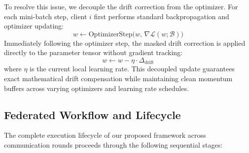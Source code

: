 To resolve this issue, we decouple the drift correction from the optimizer. For each mini-batch step, client $i$ first performs standard backpropagation and optimizer updating:
\begin{equation}
    w \leftarrow \text{OptimizerStep}\big(w, \, \nabla \mathcal{L}(w; \mathcal{B})\big)
    \label{eq:optimizer_step}
\end{equation}
Immediately following the optimizer step, the masked drift correction is applied directly to the parameter tensor without gradient tracking:
\begin{equation}
    w \leftarrow w - \eta \cdot \Delta_{\text{drift}}
    \label{eq:decoupled_step}
\end{equation}
where $\eta$ is the current local learning rate. This decoupled update guarantees exact mathematical drift compensation while maintaining clean momentum buffers across varying optimizers and learning rate schedules.

\subsection{Federated Workflow and Lifecycle}
\label{subsec:federated_workflow}

The complete execution lifecycle of our proposed framework across communication rounds proceeds through the following sequential stages:

